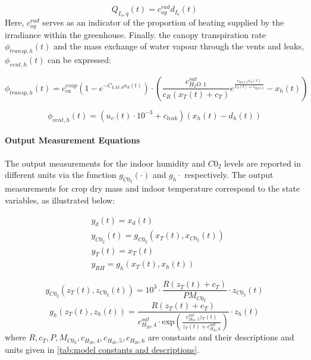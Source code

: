 \begin{equation}
	Q_{I_o,q}(t) = c_{og}^{rad} d_{I_o}(t)
\end{equation}
Here, $c_{og}^{rad}$ serves as an indicator of the proportion of heating supplied by the irradiance within the greenhouse. Finally. the canopy transpiration rate $\phi_{transp,h}(t)$ and the mass exchange of water vapour through the vents and leaks, $\phi_{vent,h}(t)$ can be expressed:

\begin{equation}
	\phi_{transp,h}(t) = c_{ca}^{evap}(1 - e^{-C_{LAI,d} x_d(t)})\cdot \left( \frac{c_{H_2O,1}^{sat}}{c_R(x_T(t)+c_T)} e^{\frac{c_{H_2O,2}x_T(t)}{x_T(t) + c_{H_2O,3}}} - x_h(t) \right)
\end{equation}

\begin{equation}
	\phi_{vent,h}(t) = (u_v(t) \cdot 10^{-3} + c_{leak})(x_h(t) - d_h(t))
\end{equation}

\paragraph{Output Measurement Equations}
The output measurements for the indoor humidity and $C0_2$ levels are reported in different units via the function $g_{C0_2}(\cdot)$ and $g_h{\cdot}$ respectively.  The output measurements for crop dry mass and indoor temperature correspond to the state variables, as illustrated below:

\begin{equation}
	\begin{aligned}
		& y_d(t) = x_d(t) 
		\\
		& y_{C0_2}(t) = g_{C0_2}(x_T(t),x_{C0_2}(t))
		\\
		& y_T (t) = x_T(t)
		\\
		& y_{RH} = g_h (x_T(t),x_h(t))
	\end{aligned}
\end{equation}

\begin{equation}
	g_{C0_2}(z_T(t),z_{C0_2}(t)) = 10^3 \cdot \frac{R(z_T(t) + c_T)}{PM_{C0_2}} \cdot z_{C0_2}(t)
\end{equation}
\begin{equation}
	g_h (z_T(t),z_h(t)) = \frac{R(z_T(t) + c_T)}{c_{H_20,4}^{sat}\cdot \text{exp}(\frac{c_{H_20,5}^{sat}z_T(t)}{z_T(t) + c_{H_20,6}^{sat}})} \cdot z_{h}(t)
\end{equation}
where $R,c_T,P,M_{C0_2},c_{H_20,4},c_{H_20,5},c_{H_20,6}$ are constants and their descriptions and units given in \autoref{tab:model constants and descriptions}.

